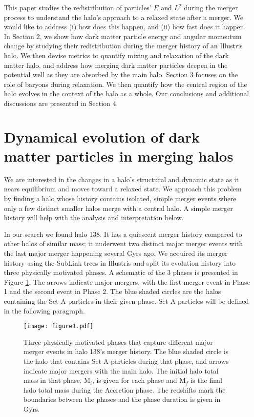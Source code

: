 \documentclass[a4paper,11pt]{article}
\begin{document}
This paper studies the redistribution of particles' $E$ and $L^2$ during the merger process to understand the halo's approach to a relaxed state after a 
merger.  We would like to address (i) how does this happen, and (ii) how fast does it happen.  In Section 2, we show
how dark matter particle energy and angular momentum change by studying their redistribution during the merger history of an Illustris halo.  We then devise 
metrics to quantify mixing and relaxation of the dark matter halo, and address how merging dark matter particles deepen in the potential well as they are absorbed by 
the main halo.  Section 3 focuses on the role of baryons during relaxation.  We then 
quantify how the central region of the halo evolves in the context of the halo as a whole.  Our conclusions and additional discussions are presented in 
Section 4.


\section{Dynamical evolution of dark matter particles in merging halos}

We are interested in the changes in a halo's structural and dynamic state as it nears equilibrium and moves toward a relaxed state.  We approach this 
problem by finding a halo whose history contains isolated, simple merger events where only a few distinct smaller halos merge with a central halo.  
A simple merger history will help with the analysis and interpretation below.

In our search we found halo 138.  It has a quiescent merger history compared to other halos of similar mass; it underwent two distinct major merger 
events with the last major merger happening several Gyrs ago.  We acquired its merger history using the SubLink trees \citep{Rod15} in Illustris and split 
its evolution history into three physically motivated phases.  A schematic of the 3 phases is presented in Figure \ref{mergerh}.  The arrows indicate 
major mergers, with the first merger event in Phase 1 and the second event in Phase 2.  The blue shaded circles are the halos containing the Set A particles 
in their given phase.  Set A particles will be defined in the following paragraph.  

\begin{figure}
\centering
\texttt{[image: figure1.pdf]}
\caption{Three physically motivated phases that capture different major merger events in halo 138's merger history.  The blue shaded circle is the halo that 
contains Set A particles during that phase, and arrows indicate major mergers with the main halo.  The initial halo total mass in that phase, $\text{M}_i$, is given for each phase
and $\text{M}_f$ is the final halo total mass during the Accretion phase.  The redshifts mark the boundaries between the phases and the phase duration is given in Gyrs.}
\label{mergerh}
\end{figure}
  
\end{document}
